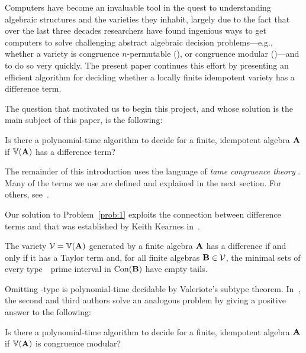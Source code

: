 Computers have become an invaluable tool in the quest to understanding 
algebraic structures and the varieties they inhabit, largely due to the fact that over the last three decades researchers have found ingenious ways to 
get computers to solve challenging abstract algebraic decision 
problems---e.g., whether a variety is congruence $n$-permutable
(\cite{MR3239624}), or congruence modular 
(\cite{Freese:2009})---and to do so very quickly.
The present paper continues this effort by presenting an efficient
algorithm for deciding whether a locally finite idempotent variety has a
difference term.

The question that motivated us to begin this project, and
whose solution is the main subject of this paper, is the following:
\begin{prob}
  \label{prob:1}
  Is there a polynomial-time algorithm to decide for a finite,
  idempotent algebra $\mathbf{A}$ if $\operatorname{\mathbb{V}}(\mathbf{A})$ has a difference term?
\end{prob}
 
The remainder of this introduction uses the language of \emph{tame congruence theory} \tct.  Many of the terms we use are defined and explained
in the next section.  For others, see~\cite{HM:1988}.

Our solution to Problem~\ref{prob:1} exploits the connection 
between difference terms and \tct that was established  
by Keith Kearnes in~\cite{MR1358491}. 

\begin{theorem}
\label{thm:KearnesThm}
The variety $\mathcal{V} = \operatorname{\mathbb{V}}(\mathbf{A})$ generated by a 
finite algebra $\mathbf{A}$ has a difference  if and only if
it has a Taylor term and, for all finite algebras 
$\mathbf{B} \in \mathcal{V}$,
the minimal sets of every type~\atyp\ prime interval in
$\operatorname{Con}(\mathbf{B})$ have empty tails.
\end{theorem}



Omitting \tct-type \utyp is polynomial-time decidable by Valeriote's subtype theorem. 
In~\cite{Freese:2009}, the second and third authors solve an 
analogous problem by giving a positive answer to the following:
\begin{prob}
  \label{prob:2}
  Is there a polynomial-time algorithm to decide for a finite,
  idempotent algebra $\mathbf{A}$ if $\operatorname{\mathbb{V}}(\mathbf{A})$ is congruence modular?
\end{prob}

